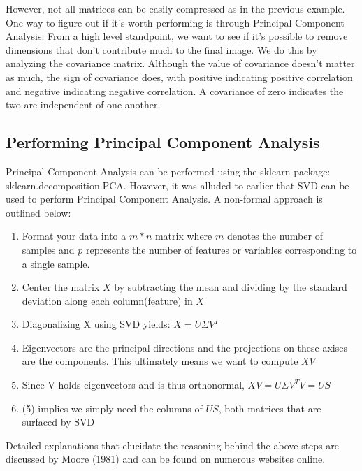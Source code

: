 \documentclass{article}
\begin{document}
However, not all matrices can be easily compressed as in the previous example. One way to figure out if it's worth performing is through Principal Component Analysis. From a high level standpoint, we want to see if it's possible to remove dimensions that don't contribute much to the final image. We do this by analyzing the covariance matrix. Although the value of covariance doesn't matter as much, the sign of covariance does, with positive indicating positive correlation and negative indicating negative correlation. A covariance of zero indicates the two are independent of one another.

\subsection{Performing Principal Component Analysis}
Principal Component Analysis can be performed using the sklearn package:
sklearn.decomposition.PCA. However, it was alluded to earlier that SVD can be used to perform Principal Component Analysis. A non-formal approach is outlined below:

\begin{enumerate}
\item Format your data into a $m * n$ matrix where $m$ denotes the number of samples and $p$ represents the number of features or variables corresponding to a single sample.
\item Center the matrix $X$ by subtracting the mean and dividing by the standard deviation along each column(feature) in $X$
\item Diagonalizing X using SVD yields: $X = U\Sigma V^{T}$
\item Eigenvectors are the principal directions and the projections on these axises are the components. This ultimately means we want to compute $XV$
\item Since V holds eigenvectors and is thus orthonormal, $XV = U\Sigma V^{T}V = US$
\item (5) implies we simply need the columns of $US$, both matrices that are surfaced by SVD
\end{enumerate}

Detailed explanations that elucidate the reasoning behind the above steps are discussed by Moore (1981) and can be found on numerous websites online.
\end{document}
